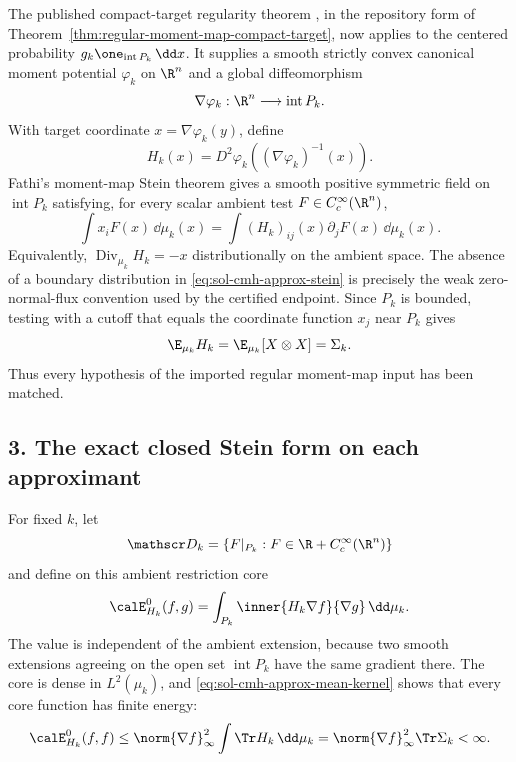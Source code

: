 \documentclass[../main.tex]{subfiles}
\begin{document}
The published compact-target regularity theorem
\cite{BermanBerndtsson2013RealMA}, in the repository form of
Theorem~\ref{thm:regular-moment-map-compact-target}, now applies to the centered probability
$g_k\one_{\operatorname{int}P_k}\,\dd x$.  It supplies a smooth strictly convex canonical
moment potential $\varphi_k$ on $\R^n$ and a global diffeomorphism
\[
  \nabla\varphi_k:\R^n\longrightarrow\operatorname{int}P_k.
\]
With target coordinate $x=\nabla\varphi_k(y)$, define
\begin{equation}
  H_k(x)=D^2\varphi_k((\nabla\varphi_k)^{-1}(x)).
  \label{eq:sol-cmh-approx-kernel}
\end{equation}
Fathi's moment-map Stein theorem \cite{Fathi2019SteinMomentMaps} gives a smooth positive
symmetric field on $\operatorname{int}P_k$ satisfying, for every scalar ambient test
$F\in C_c^\infty(\R^n)$,
\begin{equation}
  \int x_iF(x)\,\dd\mu_k(x)
  =\int (H_k)_{ij}(x)\partial_jF(x)\,\dd\mu_k(x).
  \label{eq:sol-cmh-approx-stein}
\end{equation}
Equivalently, $\operatorname{Div}_{\mu_k}H_k=-x$ distributionally on the ambient space.  The
absence of a boundary distribution in \eqref{eq:sol-cmh-approx-stein} is precisely the weak
zero-normal-flux convention used by the certified endpoint.  Since $P_k$ is bounded, testing
with a cutoff that equals the coordinate function $x_j$ near $P_k$ gives
\begin{equation}
  \E_{\mu_k}H_k=\E_{\mu_k}[X\otimes X]=\Sigma_k.
  \label{eq:sol-cmh-approx-mean-kernel}
\end{equation}
Thus every hypothesis of the imported regular moment-map input has been matched.

\subsection*{3. The exact closed Stein form on each approximant}

For fixed $k$, let
\[
  \mathscr D_k
  =\{F|_{P_k}:F\in\R+C_c^\infty(\R^n)\}
\]
and define on this ambient restriction core
\begin{equation}
  \calE_{H_k}^0(f,g)
  =\int_{P_k}\inner{H_k\nabla f}{\nabla g}\,\dd\mu_k.
  \label{eq:sol-cmh-approx-H-form}
\end{equation}
The value is independent of the ambient extension, because two smooth extensions agreeing on
the open set $\operatorname{int}P_k$ have the same gradient there.  The core is dense in
$L^2(\mu_k)$, and \eqref{eq:sol-cmh-approx-mean-kernel} shows that every core function has
finite energy:
\[
  \calE_{H_k}^0(f,f)
  \le\norm{\nabla f}_\infty^2\int\Tr H_k\,\dd\mu_k
  =\norm{\nabla f}_\infty^2\Tr\Sigma_k<\infty.
\]
\end{document}
